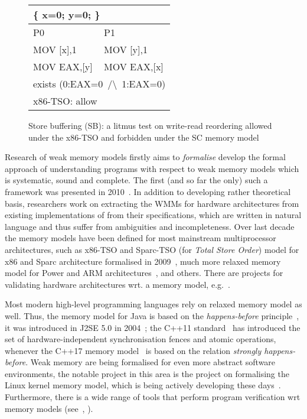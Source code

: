 \begin{figure}
\centering
\ttfamily
\begin{tabular}{ |l|l| }
\hline
\multicolumn{2}{|l|}{ \{ x=0; y=0; \}} \tabularnewline \hline
P0 & P1 \\ \hline
MOV [x],1 & MOV [y],1 \\
MOV EAX,[y] & MOV EAX,[x] \\
\hline
\multicolumn{2}{|l|}{exists (0:EAX=0~/\textbackslash~1:EAX=0)} \tabularnewline
\hline
\multicolumn{2}{|l|}{x86-TSO: allow} \tabularnewline
\hline

\end{tabular}
\caption{Store buffering (SB): a litmus test on write-read reordering allowed under the x86-TSO and forbidden under the SC memory model}
\label{simple_wmm_x86}
\end{figure}

Research of weak memory models firstly aims to \textit{formalise} develop the formal approach of understanding programs with respect to weak memory models which is systematic, sound and complete. The first (and so far the only) such a framework was presented in 2010~\cite{alglave2010shared}.
In addition to developing rather theoretical basis, researchers work on extracting the WMMs for hardware architectures from existing implementations of from their specifications, which are written in natural language and thus suffer from ambiguities and incompleteness.
Over last decade the memory models have been defined for most mainstream multiprocessor architectures, such as x86-TSO and Sparc-TSO (for \textit{Total Store Order}) model for x86 and Sparc architecture formalised in 2009~\cite{owens2009better}, much more relaxed memory model for Power and ARM architectures~\cite{alglave2009semantics,sarkar2011understanding, alglave2014herding}, and others.
There are projects for validating hardware architectures wrt. a memory model, e.g.~\cite{lustig2014pipecheck,lustig2016coatcheck}.

Most modern high-level programming languages rely on relaxed memory model as well.
Thus, the memory model for Java is based on the \textit{happens-before} principle~\cite{lamport1978time}, it was introduced in J2SE 5.0 in 2004~\cite{manson2005java}; the C++11 standard~\cite{iso2012iec} has introduced the set of hardware-independent synchronisation fences and atomic operations, whenever the C++17 memory model~\cite{batty2011mathematizing} is based on the relation \textit{strongly happens-before}. Weak memory are being formalised for even more abstract software environments, the notable project in this area is the project on formalising the Linux kernel memory model, which is being actively developing these days~\cite{kernel1}.
Furthermore, there is a wide range of tools that perform program verification wrt memory models (see~\cite{alglave2013software}, \cite{Porthos17}).

